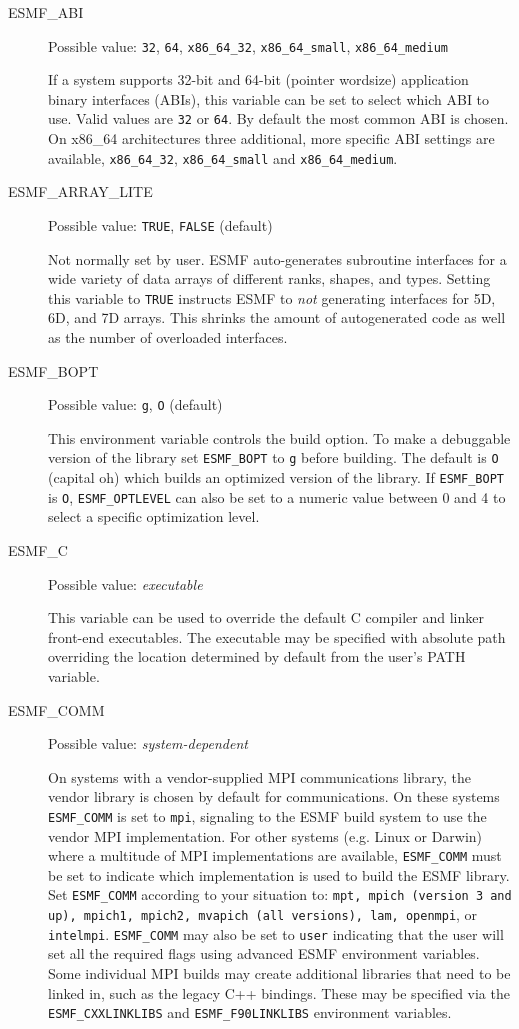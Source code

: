 \begin{description}

\item[ESMF\_ABI]
Possible value: {\tt 32}, {\tt 64}, {\tt x86\_64\_32}, {\tt x86\_64\_small}, {\tt x86\_64\_medium}

If a system supports 32-bit and 64-bit (pointer wordsize) application binary
interfaces (ABIs), this variable can be set to select which ABI to use. Valid
values are {\tt 32} or {\tt 64}. By default the most common ABI is chosen. On
x86\_64 architectures three additional, more specific ABI settings are available,
{\tt x86\_64\_32}, {\tt x86\_64\_small} and {\tt x86\_64\_medium}.

\item[ESMF\_ARRAY\_LITE]
Possible value: {\tt TRUE}, {\tt FALSE} (default)

Not normally set by user. ESMF auto-generates subroutine interfaces for a wide
variety of data arrays of different ranks, shapes, and types. Setting this
variable to {\tt TRUE} instructs ESMF to {\em not} generating interfaces for
5D, 6D, and 7D arrays. This shrinks the amount of autogenerated code as well
as the number of overloaded interfaces.

\item[ESMF\_BOPT]
Possible value: {\tt g}, {\tt O} (default)

This environment variable controls the build option. To make a debuggable
version of the library set {\tt ESMF\_BOPT} to {\tt g} before building. The
default is {\tt O} (capital oh) which builds an optimized version of the
library. If {\tt ESMF\_BOPT} is {\tt O}, {\tt ESMF\_OPTLEVEL} can also be set
to a numeric value between 0 and 4 to select a specific optimization level.

\item[ESMF\_C]
Possible value: {\em executable}

This variable can be used to override the default C compiler and linker
front-end executables. The executable may be specified with absolute path
overriding the location determined by default from the user's PATH variable.

\item[ESMF\_COMM]
Possible value: {\em system-dependent}

On systems with a vendor-supplied MPI communications library, the vendor library
is chosen by default for communications. On these systems {\tt ESMF\_COMM} is
set to {\tt mpi}, signaling to the ESMF build system to use the vendor MPI
implementation.
For other systems (e.g. Linux or Darwin) where a multitude of MPI
implementations are available, {\tt ESMF\_COMM} must be set to indicate which
implementation is used to build the ESMF library. Set {\tt ESMF\_COMM} according
to your situation to: {\tt mpt, mpich (version 3 and up), mpich1, mpich2,
mvapich (all versions), lam, openmpi}, or {\tt intelmpi}.
{\tt ESMF\_COMM} may also be set to {\tt user} indicating
that the user will set all the required flags using advanced ESMF environment
variables.  Some individual MPI builds may create additional libraries that
need to be linked in, such as the legacy C++ bindings. These may be specified
via the {\tt ESMF\_CXXLINKLIBS} and {\tt ESMF\_F90LINKLIBS} environment
variables.


\end{description}
